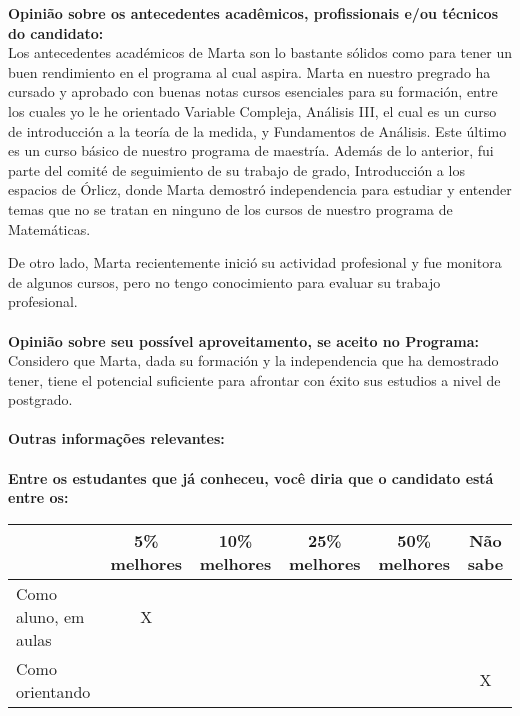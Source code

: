 \documentclass[11pt]{article}
\begin{document}
\textbf{Opinião sobre os antecedentes acadêmicos, profissionais e/ou técnicos do candidato:}
\\Los antecedentes académicos de Marta son lo bastante sólidos como para tener un buen rendimiento en el programa al cual aspira. Marta en nuestro pregrado ha cursado y aprobado con buenas notas cursos esenciales para su formación, entre los cuales yo le he orientado Variable Compleja, Análisis III, el cual es un curso de introducción a la teoría de la medida, y Fundamentos de Análisis. Este último es un curso básico de nuestro programa de maestría. Además de lo anterior, fui parte del comité de seguimiento de su trabajo de grado, Introducción a los espacios de Órlicz, donde Marta demostró independencia para estudiar y entender temas que no se tratan en ninguno de los cursos de nuestro programa de Matemáticas.

De otro lado, Marta recientemente inició su actividad profesional y fue monitora de algunos cursos, pero no tengo conocimiento para evaluar su trabajo profesional.\\
\\
\textbf{Opinião sobre seu possível aproveitamento, se aceito no Programa:}
\\Considero que Marta, dada su formación y la independencia que ha demostrado tener, tiene el potencial suficiente para afrontar con éxito sus estudios a nivel de postgrado.\\ 
\\
\textbf{Outras informações relevantes:} \\
\\[0.3cm]
\textbf{Entre os estudantes que já conheceu, você diria que o candidato está entre os:}
\\
\begin{tabular}{|l|c|c|c|c|c|}
\hline
 & 5\% melhores & 10\% melhores & 25\% melhores & 50\% melhores & Não sabe \\
\hline
Como aluno, em aulas & X &  &  &  & \\
\hline
Como orientando &  &  &  &  & X\\
\hline
\end{tabular}
\end{document}
